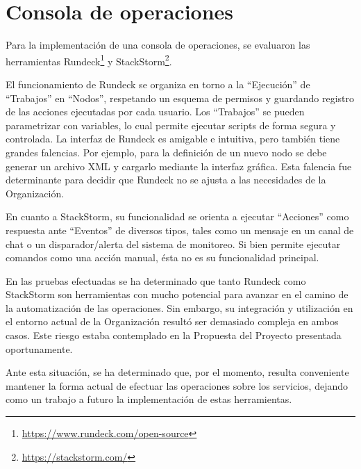 \section{Consola de operaciones}

Para la implementación de una consola de operaciones, se evaluaron las
herramientas Rundeck\footnote{
  \href{https://www.rundeck.com/open-source}{https://www.rundeck.com/open-source}
} y StackStorm\footnote{
  \href{https://stackstorm.com/}{https://stackstorm.com/} }.

El funcionamiento de Rundeck se organiza en torno a la ``Ejecución'' de
``Trabajos'' en ``Nodos'', respetando un esquema de permisos y guardando
registro de las acciones ejecutadas por cada usuario. Los ``Trabajos''
se pueden parametrizar con variables, lo cual permite ejecutar scripts
de forma segura y controlada. La interfaz de Rundeck es amigable e
intuitiva, pero también tiene grandes falencias. Por ejemplo, para la
definición de un nuevo nodo se debe generar un archivo XML y cargarlo
mediante la interfaz gráfica. Esta falencia fue determinante para
decidir que Rundeck no se ajusta a las necesidades de la Organización.

En cuanto a StackStorm, su funcionalidad se orienta a ejecutar
``Acciones'' como respuesta ante ``Eventos'' de diversos tipos, tales como
un mensaje en un canal de chat o un disparador/alerta del sistema de
monitoreo. Si bien permite ejecutar comandos como una acción manual,
ésta no es su funcionalidad principal.

En las pruebas efectuadas se ha determinado que tanto Rundeck como
StackStorm son herramientas con mucho potencial para avanzar en el
camino de la automatización de las operaciones. Sin embargo, su
integración y utilización en el entorno actual de la Organización
resultó ser demasiado compleja en ambos casos. Este riesgo estaba
contemplado en la Propuesta del Proyecto presentada oportunamente.

Ante esta situación, se ha determinado que, por el momento, resulta
conveniente mantener la forma actual de efectuar las operaciones sobre
los servicios, dejando como un trabajo a futuro la implementación de
estas herramientas.
